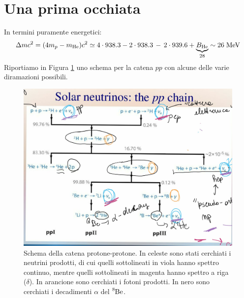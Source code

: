 \section{Una prima occhiata}
In termini puramente energetici:
$$\Delta m c^2 = (4m_p - m_{\ce{He}})c^2 \simeq 4\cdot 938.3 - 2\cdot 938.3 \,-\, 2\cdot 939.6 + \underbrace{B_{\ce{He}}}_{28} \sim 26\unit{MeV}$$
Riportiamo in Figura \ref{0318_solnu} uno schema per la catena $pp$ con alcune delle varie diramazioni possibili.

\begin{figure}[h]
    \centering
    \includegraphics[scale=0.3
    ]{Immagini/0318_solarnu.png}
    \caption{Schema della catena protone-protone. In celeste sono stati cerchiati i neutrini prodotti, di cui quelli sottolineati in viola hanno spettro continuo, mentre quelli sottolineati in magenta hanno spettro a riga ($\delta$). In arancione sono cerchiati i fotoni prodotti. In nero sono cerchiati i decadimenti $\alpha$ del $\ce{^8Be}$.}
    \label{0318_solnu}
\end{figure}

